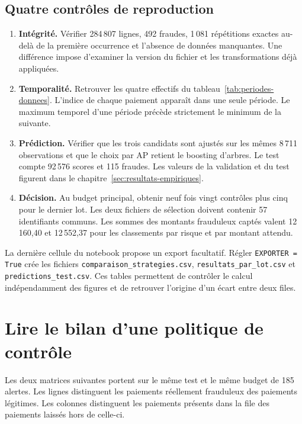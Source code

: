 \documentclass[11pt,a4paper]{article}
\begin{document}
\subsection{Quatre contrôles de reproduction}
\begin{enumerate}
\item \textbf{Intégrité.} Vérifier 284\,807 lignes, 492 fraudes, 1\,081 répétitions exactes au-delà de la première occurrence et l'absence de données manquantes. Une différence impose d'examiner la version du fichier et les transformations déjà appliquées.
\item \textbf{Temporalité.} Retrouver les quatre effectifs du tableau~\ref{tab:periodes-donnees}. L'indice de chaque paiement apparaît dans une seule période. Le maximum temporel d'une période précède strictement le minimum de la suivante.
\item \textbf{Prédiction.} Vérifier que les trois candidats sont ajustés sur les mêmes 8\,711 observations et que le choix par AP retient le boosting d'arbres. Le test compte 92\,576 scores et 115 fraudes. Les valeurs de la validation et du test figurent dans le chapitre~\ref{sec:resultats-empiriques}.
\item \textbf{Décision.} Au budget principal, obtenir neuf fois vingt contrôles plus cinq pour le dernier lot. Les deux fichiers de sélection doivent contenir 57 identifiants communs. Les sommes des montants frauduleux captés valent 12\,160,40 et 12\,552,37 pour les classements par risque et par montant attendu.
\end{enumerate}

La dernière cellule du notebook propose un export facultatif. Régler \texttt{EXPORTER = True} crée les fichiers \texttt{comparaison\_strategies.csv}, \texttt{resultats\_par\_lot.csv} et \texttt{predictions\_test.csv}. Ces tables permettent de contrôler le calcul indépendamment des figures et de retrouver l'origine d'un écart entre deux files.

\clearpage
\section{Lire le bilan d'une politique de contrôle}\label{sec:annexe-bilan}
Les deux matrices suivantes portent sur le même test et le même budget de 185 alertes. Les lignes distinguent les paiements réellement frauduleux des paiements légitimes. Les colonnes distinguent les paiements présents dans la file des paiements laissés hors de celle-ci.
\end{document}
